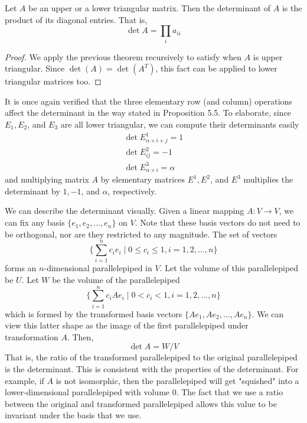   \begin{corollary}
    Let $A$ be an upper or a lower triangular matrix. Then the determinant of $A$ is the product of its diagonal entries. That is,  
    \begin{equation}
      \det{A} = \prod_{i} a_{i i}
    \end{equation}
  \end{corollary}
  \begin{proof}
    We apply the previous theorem recursively to satisfy when $A$ is upper triangular. Since $\det{(A)} = \det{(A^T)}$, this fact can be applied to lower triangular matrices too. 
  \end{proof}

  It is once again verified that the three elementary row (and column) operations affect the determinant in the way stated in Proposition 5.5. To elaborate, since $E_1, E_2$, and $E_3$ are all lower triangular, we can compute their determinants easily
  \begin{align*}
    \det{E^1_{\alpha \times i + j}} = 1 \\
    \det{E^2_{i j}} = -1 \\
    \det{E^3_{\alpha \times i}} = \alpha
  \end{align*}
  and multiplying matrix $A$ by elementary matrices $E^1, E^2$, and $E^3$ multiplies the determinant by $1, -1$, and $\alpha$, respectively. 

  We can describe the determinant visually. Given a linear mapping $A: V \longrightarrow V$, we can fix any basis $\{e_1, e_2, ..., e_n\}$ on $V$. Note that these basis vectors do not need to be orthogonal, nor are they restricted to any magnitude. The set of vectors 
  \begin{equation}
    \Big\{ \sum_{i=1}^n c_i e_i \mid 0 \leq c_i \leq 1, i = 1, 2, ..., n\Big\}
  \end{equation}
  forms an $n$-dimensional parallelepiped in $V$. Let the volume of this parallelepiped be $U$. Let $W$ be the volume of the parallelepiped 
  \begin{equation}
    \Big\{ \sum_{i=1}^n c_i A e_i \mid 0<c_i<1, i = 1, 2, ..., n\Big\}
  \end{equation}
  which is formed by the transformed basis vectors $\{Ae_1, Ae_2, ..., Ae_n\}$. We can view this latter shape as the image of the first parallelepiped under transformation $A$. Then, 
  \begin{equation}
    \det{A} = W / V 
  \end{equation}
  That is, the ratio of the transformed parallelepiped to the original parallelepiped is the determinant. This is consistent with the properties of the determinant. For example, if $A$ is not isomorphic, then the parallelepiped will get "squished" into a lower-dimensional parallelepiped with volume $0$. The fact that we use a ratio between the original and transformed parallelepiped allows this value to be invariant under the basis that we use. 


